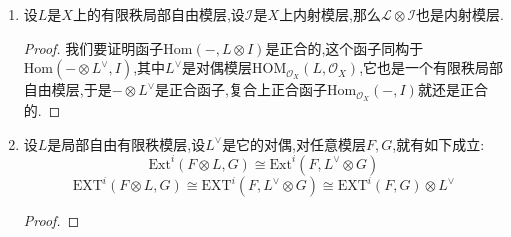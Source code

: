 \begin{enumerate}
\begin{proof}
		定义$\Psi:S\to\mathrm{Ext}_{\mathscr{O}_X}^1(F,G)$如下:任取等价类$E\in S$,任取代表元$0\to F\to H\to F\to0$,我们可以把$G\to I^0$提升为$\psi:H\to I^0$,于是存在同态$\overline{\psi}:F\to Z^1(I^*)$使得如下图表交换:
		$$\xymatrix{0\ar[r]&G\ar@{=}[d]\ar[r]&H\ar[r]\ar[d]^{\psi}&F\ar[r]\ar[d]^{\overline{\psi}}&0\\0\ar[r]&G\ar[r]&I^0\ar[r]&Z^1(I^*)\ar[r]&0}$$
		
		定义$\Psi(E)$为$\overline{\psi}:F\to Z^1(I^*)$在$\frac{\mathrm{Hom}_{\mathscr{O}_X}(F,Z^1(I^*))}{\mathrm{im}\left(\mathrm{Hom}_{\mathscr{O}_X}(F,I^0)\to\mathrm{Hom}_{\mathscr{O}_X}(F,I^1)\right)}$中的像.我们断言这个定义不依赖于提升$\psi$和$\overline{\psi}$的选取.假设还存在提升$\psi':H\to I^0$,那么$\psi-\psi'$在$\ker(G\to H)$上平凡,导致可定义$\delta:F\to I^0$使得$\overline{\psi}-\overline{\psi}'=d^0\delta$.于是$\overline{\psi}$和$\overline{\psi}'$相差$\mathrm{im}\left(\mathrm{Hom}_{\mathscr{O}_X}(F,I^0)\to\mathrm{Hom}_{\mathscr{O}_X}(F,I^1)\right)$中的元.
		
		\qquad
		
		还要验证这个定义不依赖于$E$的代表元的选取.假设还有代表元$0\to G\to H'\to F\to0$.于是存在$\alpha:H'\to H$使得两个代表元作为短正合列是同构的,于是得到如下交换图表,导致$\psi\circ\alpha:H'\to I^0$是$G\to I^0$的提升,按照我们之前证明的不依赖提升的选取,说明$\overline{\psi}$也是短正合列代表元$0\to G\to H'\to F\to0$在$\Psi$下的像,这完成证明.
		$$\xymatrix{0\ar[r]&G\ar[r]\ar@{=}[d]&H'\ar[r]\ar[d]^{\alpha}&F\ar[r]\ar@{=}[d]&0\\0\ar[r]&G\ar[r]\ar@{=}[d]&H\ar[r]\ar[d]^{\psi}&F\ar[r]\ar[d]^{\overline{\psi}}&0\\0\ar[r]&G\ar[r]&I^0\ar[r]&Z^1(I^*)\ar[r]&0}$$
		
		最后验证$\Phi$和$\Psi$互为逆映射.验证$\Psi\circ\Phi=1$是直接的,验证$\Phi\circ\Psi=1$只要注意如下交换图表:
		$$\xymatrix{0\ar[r]&G\ar[r]\ar@{=}[d]&H\ar[d]\ar[r]&F\ar[r]\ar@{=}[d]&0\\0\ar[r]&G\ar[r]\ar@{=}[d]&I^0\oplus_{e'}F\ar[r]\ar[d]&F\ar[d]^{\overline{\psi}}\ar[r]&0\\0\ar[r]&G\ar[r]&I^0\ar[r]&Z^1(I^*)\ar[r]&0}$$
	\end{proof}
	\item 设$L$是$X$上的有限秩局部自由模层,设$\mathscr{I}$是$X$上内射模层,那么$\mathscr{L}\otimes\mathscr{I}$也是内射模层.
	\begin{proof}
		
		我们要证明函子$\mathrm{Hom}(-,L\otimes I)$是正合的,这个函子同构于$\mathrm{Hom}(-\otimes L^{\vee},I)$,其中$L^{\vee}$是对偶模层$\mathrm{HOM}_{\mathscr{O}_X}(L,\mathscr{O}_X)$,它也是一个有限秩局部自由模层,于是$-\otimes L^{\vee}$是正合函子,复合上正合函子$\mathrm{Hom}_{\mathscr{O}_X}(-,I)$就还是正合的.
	\end{proof}
	\item 设$L$是局部自由有限秩模层,设$L^{\vee}$是它的对偶,对任意模层$F,G$,就有如下成立:
	$$\mathrm{Ext}^i(F\otimes L,G)\cong\mathrm{Ext}^i(F,L^{\vee}\otimes G)$$
	$$\mathrm{EXT}^i(F\otimes L,G)\cong\mathrm{EXT}^i(F,L^{\vee}\otimes G)\cong\mathrm{EXT}^i(F,G)\otimes L^{\vee}$$
	\begin{proof}
		

\end{proof}
\end{enumerate}
